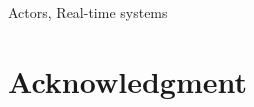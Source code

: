 \documentclass[conference]{IEEEtran}
\begin{document}
	\begin{IEEEkeywords}
		Actors, Real-time systems\end{IEEEkeywords}
	

%
%
%





	
	
	
	\section*{Acknowledgment}
	
	
	
	
	
	
\end{document}
